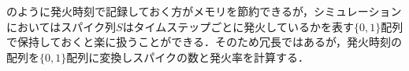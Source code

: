 のように発火時刻で記録しておく方がメモリを節約できるが，シミュレーションにおいてはスパイク列$S$はタイムステップごとに発火しているかを表す$\{0,1\}$配列で保持しておくと楽に扱うことができる．そのため冗長ではあるが，発火時刻の配列を$\{0,1\}$配列に変換しスパイクの数と発火率を計算する．
